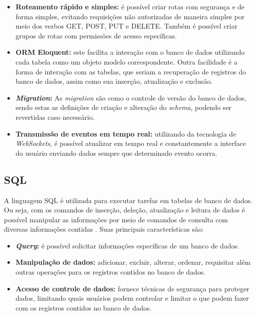 \begin{itemize}
    \item \textbf{Roteamento rápido e simples:} é possível criar rotas com segurança e de forma simples, evitando requisições não autorizadas de maneira simples por meio dos verbos GET, POST, PUT e DELETE. Também é possível criar grupos de rotas com permissões de acesso específicas.
    \item \textbf{ORM Eloquent:} este facilita a interação com o banco de dados utilizando cada tabela como um objeto modelo correspondente. Outra facilidade é a forma de interação com as tabelas, que seriam a recuperação de registros do banco de dados, assim como sua inserção, atualização e exclusão.
    \item \textbf{\textit{Migration}:} As \textit{migration} são como o controle de versão do banco de dados, sendo estas as definições de criação e alteração do \textit{schema}, podendo ser revertidas caso necessário.
    \item \textbf{Transmissão de eventos em tempo real:} utilizando da tecnologia de \textit{WebSockets}, é possível atualizar em tempo real e constantemente a interface do usuário enviando dados sempre que determinado evento ocorra.
\end{itemize}

\subsection{SQL}
A linguagem SQL é utilizada para executar tarefas em tabelas de banco de dados. Ou seja, com os comandos de inserção, deleção, atualização e leitura de dados é possível manipular as informações por meio de comandos de consulta com diversas informações contidas \cite{HEUSER}. Suas principais características são:
\begin{itemize}
    \item \textbf{\textit{Query}:} é possível solicitar informações específicas de um banco de dados.
    \item \textbf{Manipulação de dados:} adicionar, excluir, alterar, ordenar, requisitar além outras operações para os registros contidos no banco de dados.
    \item \textbf{Acesso de controle de dados:} fornece técnicas de segurança para proteger dados, limitando quais usuários podem controlar e limitar o que podem fazer com os registros contidos no banco de dados.
\end{itemize}
